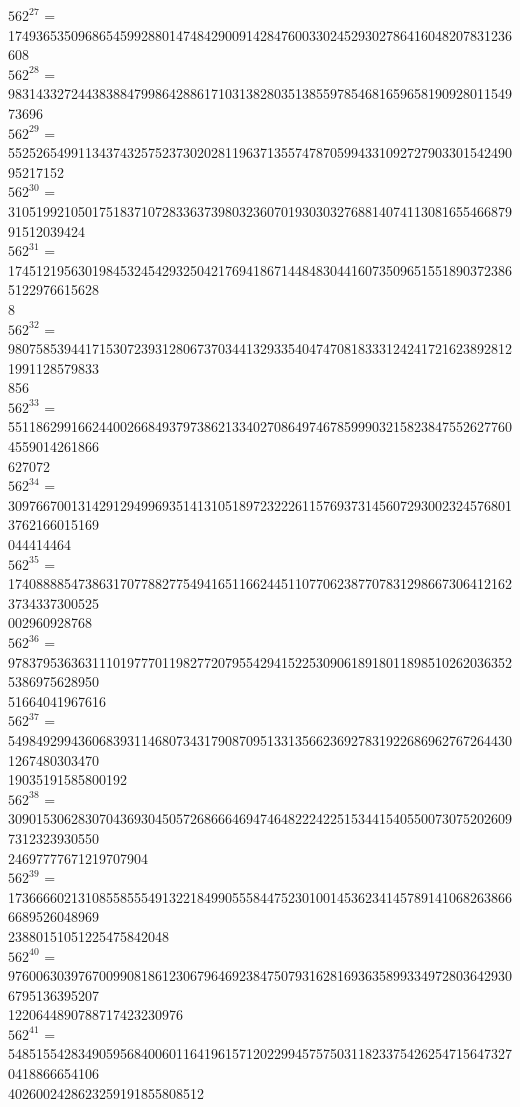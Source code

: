 \documentclass[uplatex]{jsarticle}
\begin{document}
$562^{27}$ = 174936535096865459928801474842900914284760033024529302786416048207831236608\\
$562^{28}$ = 98314332724438388479986428861710313828035138559785468165965819092801154973696\\
$562^{29}$ = 55252654991134374325752373020281196371355747870599433109272790330154249095217152\\
$562^{30}$ = 31051992105017518371072833637398032360701930303276881407411308165546687991512039424\\
$562^{31}$ = 1745121956301984532454293250421769418671448483044160735096515518903723865122976615628\\8\\
$562^{32}$ = 9807585394417153072393128067370344132933540474708183331242417216238928121991128579833\\856\\
$562^{33}$ = 5511862991662440026684937973862133402708649746785999032158238475526277604559014261866\\627072\\
$562^{34}$ = 3097667001314291294996935141310518972322261157693731456072930023245768013762166015169\\044414464\\
$562^{35}$ = 1740888854738631707788277549416511662445110770623877078312986673064121623734337300525\\002960928768\\
$562^{36}$ = 9783795363631110197770119827720795542941522530906189180118985102620363525386975628950\\51664041967616\\
$562^{37}$ = 5498492994360683931146807343179087095133135662369278319226869627672644301267480303470\\19035191585800192\\
$562^{38}$ = 3090153062830704369304505726866646947464822242251534415405500730752026097312323930550\\24697777671219707904\\
$562^{39}$ = 1736666021310855855549132218499055584475230100145362341457891410682638666689526048969\\23880151051225475842048\\
$562^{40}$ = 9760063039767009908186123067964692384750793162816936358993349728036429306795136395207\\1220644890788717423230976\\
$562^{41}$ = 5485155428349059568400601164196157120229945757503118233754262547156473270418866654106\\4026002428623259191855808512\\
\end{document}
